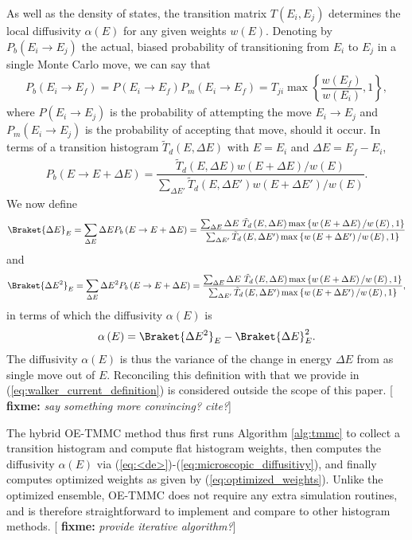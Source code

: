 \documentclass[11pt]{article}
\newcommand{\bk}{\Braket} %
\newcommand{\f}[2]{\dfrac{#1}{#2}} %
\newcommand{\p}[1]{\left(#1\right)} %
\renewcommand{\set}[1]{\left\{#1\right\}} %
\newcommand{\red}[1]{{\bf \color{red} #1}}
\newcommand{\fixme}[1]{[\red{fixme:} \emph{#1}]}
\begin{document}
As well as the density of states, the transition matrix $T\p{E_i,E_j}$
determines the local diffusivity $\alpha\p{E}$ for any given weights
$w\p{E}$. Denoting by $P_b\p{E_i\to E_j}$ the actual, biased
probability of transitioning from $E_i$ to $E_j$ in a single Monte
Carlo move, we can say that
\begin{align}
  P_b\p{E_i\to E_f}=P\p{E_i\to E_f}P_m\p{E_i\to E_f}
  =T_{ji}\max\set{\f{w\p{E_f}}{w\p{E_i}},1},
\end{align}
where $P\p{E_i\to E_j}$ is the probability of attempting the move
$E_i\to E_j$ and $P_m\p{E_i\to E_j}$ is the probability of accepting
that move, should it occur. In terms of a transition histogram $\tilde
T_d\p{E,\Delta E}$ with $E=E_i$ and $\Delta E=E_f-E_i$,
\begin{align}
  P_b\p{E\to E+\Delta E} =\f{\tilde T_d\p{E,\Delta E}w\p{E+\Delta
      E}/w\p{E}} {\sum_{\Delta E'}\tilde T_d\p{E,\Delta
      E'}w\p{E+\Delta E'}/w\p{E}}.
  \label{eq:actual_transition_prob}
\end{align}
We now define
\begin{align}
  \bk{\Delta E}_E=\sum_{\Delta E}\Delta E P_b\p{E\to E+\Delta E}
  =\f{\sum_{\Delta E}\Delta E~\tilde T_d\p{E,\Delta E}
    \max\set{w\p{E+\Delta E}/w\p{E},1}} {\sum_{\Delta E'}\tilde
    T_d\p{E,\Delta E'} \max\set{w\p{E+\Delta E'}/w\p{E},1}}
  \label{eq:<de>}
\end{align}
and
\begin{align}
  \bk{\Delta E^2}_E=\sum_{\Delta E}\Delta E^2 P_b\p{E\to E+\Delta E}
  =\f{\sum_{\Delta E}\Delta E~\tilde T_d\p{E,\Delta E}
    \max\set{w\p{E+\Delta E}/w\p{E},1}} {\sum_{\Delta E'}\tilde
    T_d\p{E,\Delta E'} \max\set{w\p{E+\Delta E'}/w\p{E},1}},
  \label{eq:<de^2>}
\end{align}
in terms of which the diffusivity $\alpha\p{E}$ is
\begin{align}
  \alpha\p{E}=\bk{\Delta E^2}_E -\bk{\Delta E}_E^2.
  \label{eq:microscopic_diffusitivy}
\end{align}
The diffusivity $\alpha\p{E}$ is thus the variance of the change in
energy $\Delta E$ from as single move out of $E$. Reconciling this
definition with that we provide in
(\ref{eq:walker_current_definition}) is considered outside the scope
of this paper. \fixme{say something more convincing? cite?}

The hybrid OE-TMMC method thus first runs Algorithm \ref{alg:tmmc} to
collect a transition histogram and compute flat histogram weights,
then computes the diffusivity $\alpha\p{E}$ via
(\ref{eq:<de>})-(\ref{eq:microscopic_diffusitivy}), and finally
computes optimized weights as given by
(\ref{eq:optimized_weights}). Unlike the optimized ensemble, OE-TMMC
does not require any extra simulation routines, and is therefore
straightforward to implement and compare to other histogram methods.
\fixme{provide iterative algorithm?}
\end{document}
